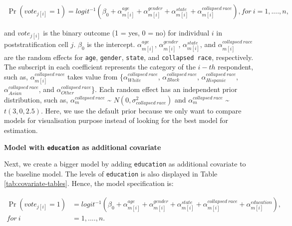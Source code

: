 \documentclass{monashthesis}
\begin{document}
\begin{equation} 
\begin{split}
\Pr(vote_{j[i]} = 1) = logit^{-1}\left(\beta_0 + \alpha^{age}_{m[i]} + \alpha^{gender}_{m[i]} + \alpha^{state}_{m[i]} + \alpha^{collapsed\ race}_{m[i]}\right), for\ i = 1, ...., n, 
\end{split}
\label{eq:baseline-model}
\end{equation}

and \(vote_{j[i]}\) is the binary outcome (1 = yes, 0 = no) for individual \(i\) in poststratification cell \(j\). \(\beta_0\) is the intercept. \(\alpha^{age}_{m[i]}\), \(\alpha^{gender}_{m[i]}\), \(\alpha^{state}_{m[i]}\), and \(\alpha^{collapsed\ race}_{m[i]}\) are the random effects for \texttt{age}, \texttt{gender}, \texttt{state}, and \texttt{collapsed\ race}, respectively. The subscript in each coefficient represents the category of the \(i-th\) respondent, such as, \(\alpha^{collapsed\ race}_{m[i]}\) takes value from \{\(\alpha^{collapsed\ race}_{White}\), \(\alpha^{collapsed\ race}_{Black}\), \(\alpha^{collapsed\ race}_{Hispanic}\), \(\alpha^{collapsed\ race}_{Asian}\), and \(\alpha^{collapsed\ race}_{Other}\)\}. Each random effect has an independent prior distribution, such as, \(\alpha^{collapsed\ race}_{m}\) \textasciitilde{} \(N(0, \sigma^2_{collapsed\ race})\) and \(\alpha^{collapsed\ race}_{m}\) \textasciitilde{} \(t(3, 0, 2.5)\). Here, we use the default prior because we only want to compare models for visualisation purpose instead of looking for the best model for estimation.

\vspace{\baselineskip}

\textbf{Model with \texttt{education} as additional covariate}

Next, we create a bigger model by adding \texttt{education} as additional covariate to the baseline model. The levels of \texttt{education} is also displayed in Table \ref{tab:covariate-tables}. Hence, the model specification is:

\begin{equation} 
\begin{split}
\Pr(vote_{j[i]} = 1) &= logit^{-1}\left(\beta_0 + \alpha^{age}_{m[i]} + \alpha^{gender}_{m[i]} + \alpha^{state}_{m[i]} + \alpha^{collapsed\ race}_{m[i]} + \alpha^{education}_{m[i]}\right), \\
for\ i &= 1, ...., n.
\end{split}
\label{eq:model2}
\end{equation}
\end{document}
